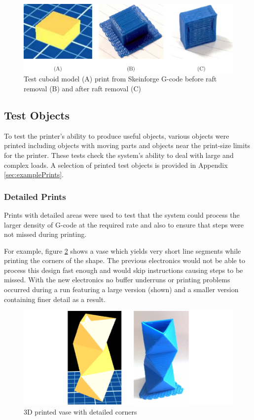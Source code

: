 			\begin{figure}
				\includegraphics[width=1\textwidth]{diagrams/testCubes.pdf}
				\caption{Test cuboid model (A) print from Skeinforge G-code before raft
				         removal (B) and after raft removal (C)}
				\label{fig:testCubes}
			\end{figure}
			
		
		\subsection{Test Objects}
			
			To test the printer's ability to produce useful objects, various objects
			were printed including objects with moving parts and objects near the
			print-size limits for the printer. These tests check the system's ability
			to deal with large and complex loads. A selection of printed test objects
			is provided in Appendix \ref{sec:examplePrints}.
			
			\subsubsection{Detailed Prints}
				
				Prints with detailed areas were used to test that the system could
				process the larger density of G-code at the required rate and also to
				ensure that steps were not missed during printing.
				
				For example, figure \ref{fig:vase} shows a vase which yields very short
				line segments while printing the corners of the shape. The previous
				electronics would not be able to process this design fast enough and
				would skip instructions causing steps to be missed. With the new
				electronics no buffer underruns or printing problems occurred during a
				run featuring a large version (shown) and a smaller version containing
				finer detail as a result.
				
				\begin{figure}
					\includegraphics[width=1\textwidth]{diagrams/vase.pdf}
					\caption{3D printed vase with detailed corners}
					\label{fig:vase}
				\end{figure}
			
